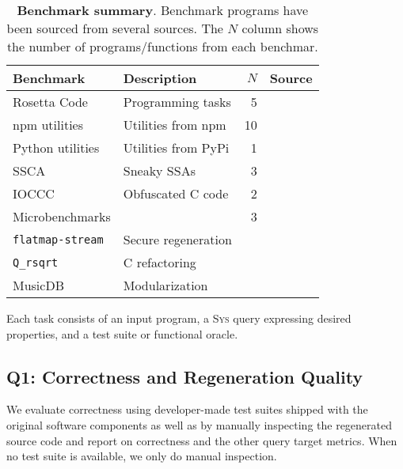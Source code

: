 \documentclass[sigplan]{acmart}
\newcommand{\sys}{{\scshape Sys}\xspace}
\newcommand{\ttt}[1]{\texttt{#1}}
\begin{document}
\begin{table}[h]
\centering
  \caption{\textbf{Benchmark summary}. 
  Benchmark programs have been sourced from several sources.
  The $N$ column shows the number of programs/functions from each benchmar.
  }
\begin{tabular}{llrl}
\toprule
Benchmark                                               & Description                    & $N$ & Source \\
\midrule
  Rosetta Code                                          & Programming tasks              & 5 & \cite{rosettacode} \\
  npm utilities                                           & Utilities from npm             & 10 & \cite{regbench2025} \\
Python utilities                                        & Utilities from PyPi            & 1 & \cite{regbench2025} \\
  SSCA                                                    & Sneaky SSAs    & 3 & \cite{ev:eurosec:2022, es1, ohm2020backstabber} \\
  IOCCC                                                   & Obfuscated C code              & 2 & \cite{ioccc} \\
Microbenchmarks                                         &          & 3    & \\
  \hspace{.5em} \ttt{flatmap-stream}                      & Secure regeneration            &      & \cite{es1}  \\
  \hspace{.5em} \ttt{Q_rsqrt}                             & C refactoring        &      & \cite{fast_inv_sqrt}  \\
  \hspace{.5em} \textsf{MusicDB}                          & Modularization           &      & \cite{codewithsadeemusicplayer} \\
\bottomrule
\end{tabular}
\label{tab:benchmarks}
\end{table}

Each task consists of an input program, a \sys query expressing desired properties, and a test suite or functional oracle.

\subsection{Q1: Correctness and Regeneration Quality}

We evaluate correctness using developer-made test suites 
shipped with the original software components as well as by manually inspecting
the regenerated source code and report on correctness and the other query target metrics.
When no test suite is available, we only do manual inspection.
\end{document}
